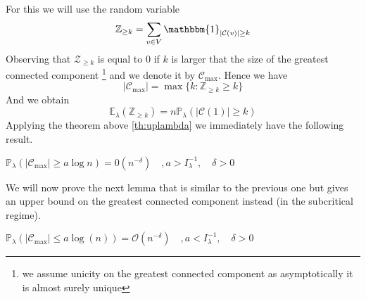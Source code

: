 \newline
For this we will use the random variable 
\begin{equation}
	\mathbb{Z}_{\geq k } = \sum_{v \in V} \mathbbm{1}_{|\mathcal{C}(v)| \geq k}
\end{equation}
Observing that $\mathcal{Z}_{\geq k}$ is equal to 0 if $k$ is larger that the size of the greatest connected component \footnote{ we assume unicity on the greatest connected component as asymptotically it is almost surely unique } and we denote it by $\mathcal{C}_{\max}$. Hence we have
\begin{equation}
	|\mathcal{C}_{\max}| = \max\{k: \mathbb{Z}_{\geq k} \geq k\}
\end{equation}
And we obtain 
\begin{equation}\label{eq:nexplambda}
	\mathbb{E}_{\lambda}(\mathbb{Z}_{\geq k}) = n \mathbb{P}_{\lambda}(|\mathcal{C}(1)| \geq k)
\end{equation}
Applying the theorem above \ref{th:uplambda} we immediately have the following result.
\begin{lemma}\label{lemmalambdainf}
	$\mathbb{P}_{\lambda}(|\mathcal{C}_{\max}| \geq a \log n) = \mathcal{0}(n^{-\delta}) \quad, a>I_{\lambda}^{-1}, \quad \delta > 0$
\end{lemma}
We will now prove the next lemma that is similar to the previous one but gives an upper bound on the greatest connected component instead (in the subcritical regime).
\begin{lemma}\label{lemmalambdasup}
	$\mathbb{P}_{\lambda}(|\mathcal{C}_{\max}| \leq a\log(n)) = \mathcal{O}(n^{-\delta})\quad, a<I_{\lambda}^{-1}, \quad \delta >0$
\end{lemma}
